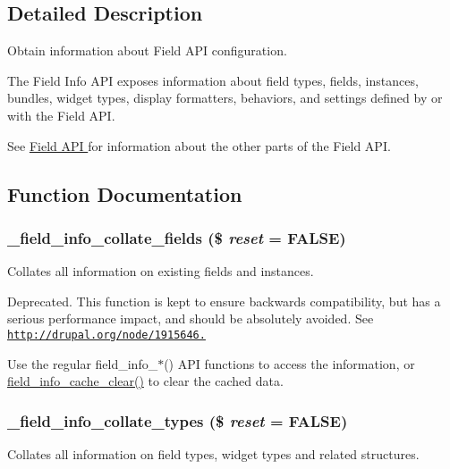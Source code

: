 \subsection{Detailed Description}
Obtain information about Field API configuration.

The Field Info API exposes information about field types, fields, instances, bundles, widget types, display formatters, behaviors, and settings defined by or with the Field API.

See \hyperlink{group__field}{Field API } for information about the other parts of the Field API. 

\subsection{Function Documentation}
\hypertarget{group__field__info_gaf30341049660e58d46d0e132b88808b1}{
\subsubsection[{\_\-field\_\-info\_\-collate\_\-fields}]{\setlength{\rightskip}{0pt plus 5cm}\_\-field\_\-info\_\-collate\_\-fields (\$ {\em reset} = {\ttfamily FALSE})}}
\label{group__field__info_gaf30341049660e58d46d0e132b88808b1}
Collates all information on existing fields and instances.

Deprecated. This function is kept to ensure backwards compatibility, but has a serious performance impact, and should be absolutely avoided. See \href{http://drupal.org/node/1915646.}{\tt http://drupal.org/node/1915646.}

Use the regular field\_\-info\_\-$\ast$() API functions to access the information, or \hyperlink{group__field__info_ga40cf38b714f91269818e2e65c860c794}{field\_\-info\_\-cache\_\-clear()} to clear the cached data. \hypertarget{group__field__info_gaa67e86dc65fe20e4669170ee665cfae4}{
\subsubsection[{\_\-field\_\-info\_\-collate\_\-types}]{\setlength{\rightskip}{0pt plus 5cm}\_\-field\_\-info\_\-collate\_\-types (\$ {\em reset} = {\ttfamily FALSE})}}
\label{group__field__info_gaa67e86dc65fe20e4669170ee665cfae4}
Collates all information on field types, widget types and related structures.


